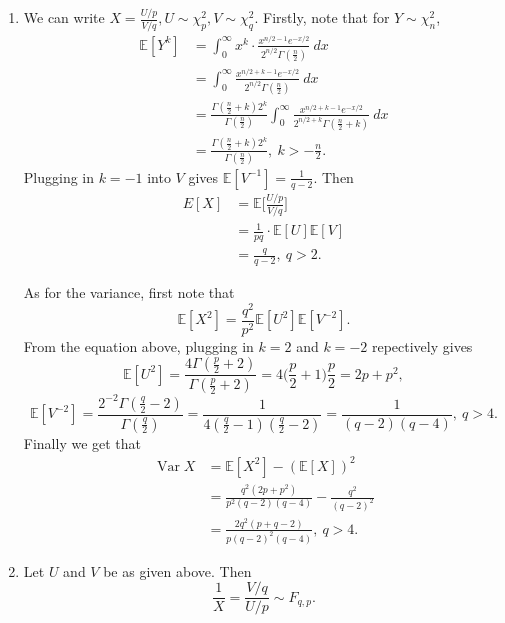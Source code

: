 \documentclass{article}
\DeclareMathOperator{\var}{Var}
\begin{document}
\begin{enumerate}
\begin{enumerate}
        \item We can write $X = \frac{U / p}{V / q}, U \sim \chi_p^2, V \sim \chi_q^2$. Firstly, note that 
        for $Y \sim \chi_n^2$, 
        \begin{align*}
            \mathbb{E}[Y^k] 
            &= \int_{0}^{\infty} x^k \cdot \frac{x^{n / 2 - 1}e^{-x / 2}}{2^{n / 2} \Gamma(\frac{n}{2})} 
            \ dx \\
            &= \int_{0}^{\infty} \frac{x^{n / 2 + k - 1}e^{-x / 2}}{2^{n / 2} \Gamma(\frac{n}{2})} 
            \ dx \\
            &= \frac{\Gamma(\frac{n}{2} + k) 2^k}{\Gamma(\frac{n}{2})} \int_{0}^{\infty} 
            \frac{x^{n / 2 + k - 1}e^{-x / 2}}{2^{n / 2 + k} \Gamma(\frac{n}{2} + k)} \ dx \\
            &= \frac{\Gamma(\frac{n}{2} + k) 2^k}{\Gamma(\frac{n}{2})}, \ k > -\frac{n}{2}.
        \end{align*}
        Plugging in $k = -1$ into $V$ gives $\mathbb{E}[V^{-1}] = \frac{1}{q - 2}$. Then 
        \begin{align*}
            E[X] 
            &= \mathbb{E} \bigl[ \frac{U / p}{V / q} \bigr] \\
            &= \frac{1}{pq} \cdot \mathbb{E}[U]\mathbb{E}[V] \\
            &= \frac{q}{q - 2}, \ q > 2.
        \end{align*}

        As for the variance, first note that 
        \[ \mathbb{E}[X^2] = \frac{q^2}{p^2} \mathbb{E}[U^2]\mathbb{E}[V^{-2}]. \]
        From the equation above, plugging in $k = 2$ and $k = -2$ repectively gives 
        \[ \mathbb{E}[U^2]= \frac{4\Gamma(\frac{p}{2} + 2)}{\Gamma(\frac{p}{2} + 2)} 
        = 4\bigl( \frac{p}{2} + 1 \bigr) \frac{p}{2} = 2p + p^2, \]
        \[ \mathbb{E}[V^{-2}] = \frac{2^{-2} \Gamma(\frac{q}{2} - 2)}{\Gamma(\frac{q}{2})} 
        = \frac{1}{4(\frac{q}{2} - 1)(\frac{q}{2} - 2)} = \frac{1}{(q - 2)(q - 4)}, \ q > 4. \]
        Finally we get that 
        \begin{align*}
            \var{X} 
            &= \mathbb{E}[X^2] - (\mathbb{E}[X])^2 \\
            &= \frac{q^2(2p + p^2)}{p^2(q - 2)(q - 4)} - \frac{q^2}{(q - 2)^2} \\
            &= \frac{2q^2(p + q - 2)}{p(q - 2)^2 (q - 4)}, \ q > 4.
        \end{align*}

        \item Let $U$ and $V$ be as given above. Then 
        \[ \frac{1}{X} = \frac{V / q}{U / p} \sim F_{q, p}. \]


\end{enumerate}
\end{enumerate}
\end{document}
